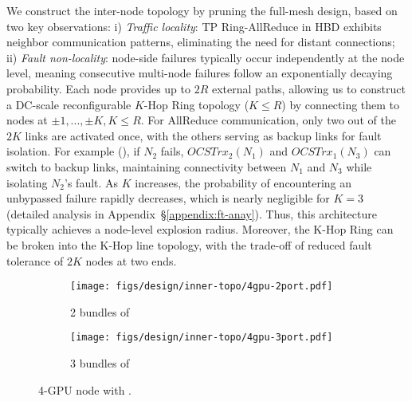 We construct the inter-node topology by pruning the full-mesh design, based on two key observations:
i) \textit{Traffic locality}: TP Ring-AllReduce in HBD exhibits neighbor communication patterns, eliminating the need for distant connections; 
ii) \textit{Fault non-locality}: node-side failures typically occur independently at the node level, meaning consecutive multi-node failures follow an exponentially decaying probability.
Each node provides up to $2R$ external paths, allowing us to construct a DC-scale reconfigurable $K$-Hop Ring topology ($K\leq R$) by connecting them to nodes at $\pm 1,...,\pm K, K\leq R$. For AllReduce communication, only two out of the $2K$ links are activated once, with the others serving as backup links for fault isolation.
For example (), if $N_2$ fails, $OCSTrx_2(N_1)$ and $OCSTrx_1(N_3)$ can switch to backup links, maintaining connectivity between $N_1$ and $N_3$ while isolating $N_2$'s fault. As $K$ increases, the probability of encountering an unbypassed failure rapidly decreases, which is nearly negligible for $K=3$ (detailed analysis in Appendix~\S\ref{appendix:ft-anay}). Thus, this architecture typically achieves a node-level explosion radius.
Moreover, the K-Hop Ring can be broken into the K-Hop line topology, with the trade-off of reduced fault tolerance of $2K$ nodes at two ends.


\begin{figure}[h!t]
    \centering
    \begin{subfigure}[b]{0.22\textwidth}
        \centering
        \texttt{[image: figs/design/inner-topo/4gpu-2port.pdf]}
        \caption{2 bundles of \ocstrx}
        \label{fig:4g3d}
    \end{subfigure}
    \hspace{10pt}
    \begin{subfigure}[b]{0.22\textwidth}
        \centering
        \texttt{[image: figs/design/inner-topo/4gpu-3port.pdf]}
        \caption{3 bundles of \ocstrx}
        \label{fig:4g2d}
    \end{subfigure}
    \vspace{-2ex}
    \caption{4-GPU node with \docs.}
    \label{fig:inner-topo}
    \vspace{-2ex}

\end{figure}






